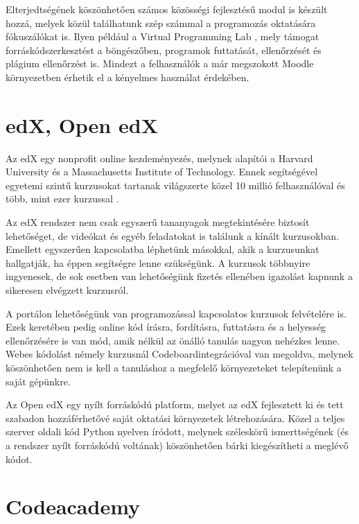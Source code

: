 Elterjedtségének köszönhetően számos közösségi fejlesztésű modul is készült hozzá, melyek közül találhatunk szép számmal a programozás oktatására fókuszálókat is. Ilyen például a Virtual Programming Lab \cite{VPL} \cite{VPLJournal}, mely támogat forráskódszerkesztést a böngészőben, programok futtatását, ellenőrzését és plágium ellenőrzést is. Mindezt a felhasználók a már megszokott Moodle környezetben érhetik el a kényelmes használat érdekében.

\section{edX, Open edX}
Az edX \cite{EDXAbout} egy nonprofit online kezdeményezés, melynek alapítói a Harvard University és a Massachusetts Institute of Technology. Ennek segítségével egyetemi szintű kurzusokat tartanak világszerte közel 10 millió felhasználóval és több, mint ezer kurzussal \cite{EDXReview}.

Az edX rendszer nem csak egyszerű tananyagok megtekintésére biztosít lehetőséget, de videókat és egyéb feladatokat is találunk a kínált kurzusokban. Emellett egyszerűen kapcsolatba léphetünk másokkal, akik a kurzusunkat hallgatják, ha éppen segítségre lenne szükségünk. A kurzusok többnyire ingyenesek, de sok esetben van lehetőségünk fizetés ellenében igazolást kapnunk a sikeresen elvégzett kurzusról.

A portálon lehetőségünk van programozással kapcsolatos kurzusok felvételére is. Ezek keretében pedig online kód írásra, fordításra, futtatásra és a helyesség ellenőrzésére is van mód, amik nélkül az önálló tanulás nagyon nehézkes lenne. Webes kódolást némely kurzusnál Codeboard\footnotemark integrációval van megoldva, melynek köszönhetően nem is kell a tanuláshoz a megfelelő környezeteket telepítenünk a saját gépünkre.

Az Open edX egy nyílt forráskódú platform, melyet az edX fejlesztett ki és tett szabadon hozzáférhetővé saját oktatási környezetek létrehozására. Közel a teljes szerver oldali kód Python nyelven íródott, melynek széleskörű ismerttségének (és a rendszer nyílt forráskódú voltának) köszönhetően bárki kiegészítheti a meglévő kódot.

\section{Codeacademy}

